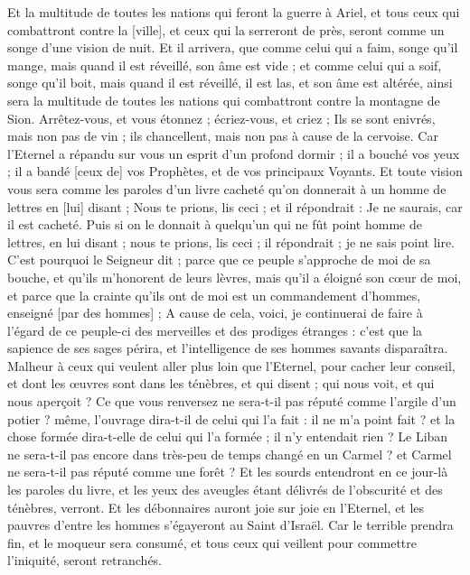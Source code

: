 \begin{multicols}{2}
Et la multitude de toutes les nations qui feront la guerre à Ariel, et tous ceux qui combattront contre la [ville], et ceux qui la serreront de près, seront comme un songe d'une vision de nuit.
Et il arrivera, que comme celui qui a faim, songe qu'il mange, mais quand il est réveillé, son âme est vide ; et comme celui qui a soif, songe qu'il boit, mais quand il est réveillé, il est las, et son âme est altérée, ainsi sera la multitude de toutes les nations qui combattront contre la montagne de Sion.
Arrêtez-vous, et vous étonnez ; écriez-vous, et criez ; Ils se sont enivrés, mais non pas de vin ; ils chancellent, mais non pas à cause de la cervoise.
Car l'Eternel a répandu sur vous un esprit d'un profond dormir ; il a bouché vos yeux ; il a bandé [ceux de] vos Prophètes, et de vos principaux Voyants.
Et toute vision vous sera comme les paroles d'un livre cacheté qu'on donnerait à un homme de lettres en [lui] disant ; Nous te prions, lis ceci ; et il répondrait : Je ne saurais, car il est cacheté.
Puis si on le donnait à quelqu'un qui ne fût point homme de lettres, en lui disant ; nous te prions, lis ceci ; il répondrait ; je ne sais point lire.
C'est pourquoi le Seigneur dit ; parce que ce peuple s'approche de moi de sa bouche, et qu'ils m'honorent de leurs lèvres, mais qu'il a éloigné son cœur de moi, et parce que la crainte qu'ils ont de moi est un commandement d'hommes, enseigné [par des hommes] ;
A cause de cela, voici, je continuerai de faire à l'égard de ce peuple-ci des merveilles et des prodiges étranges : c'est que la sapience de ses sages périra, et l'intelligence de ses hommes savants disparaîtra.
Malheur à ceux qui veulent aller plus loin que l'Eternel, pour cacher leur conseil, et dont les œuvres sont dans les ténèbres, et qui disent ; qui nous voit, et qui nous aperçoit ?
Ce que vous renversez ne sera-t-il pas réputé comme l'argile d'un potier ? même, l'ouvrage dira-t-il de celui qui l'a fait : il ne m'a point fait ? et la chose formée dira-t-elle de celui qui l'a formée ; il n'y entendait rien ?
Le Liban ne sera-t-il pas encore dans très-peu de temps changé en un Carmel ? et Carmel ne sera-t-il pas réputé comme une forêt ?
Et les sourds entendront en ce jour-là les paroles du livre, et les yeux des aveugles étant délivrés de l'obscurité et des ténèbres, verront.
Et les débonnaires auront joie sur joie en l'Eternel, et les pauvres d'entre les hommes s'égayeront au Saint d'Israël.
Car le terrible prendra fin, et le moqueur sera consumé, et tous ceux qui veillent pour commettre l'iniquité, seront retranchés.

\end{multicols}
